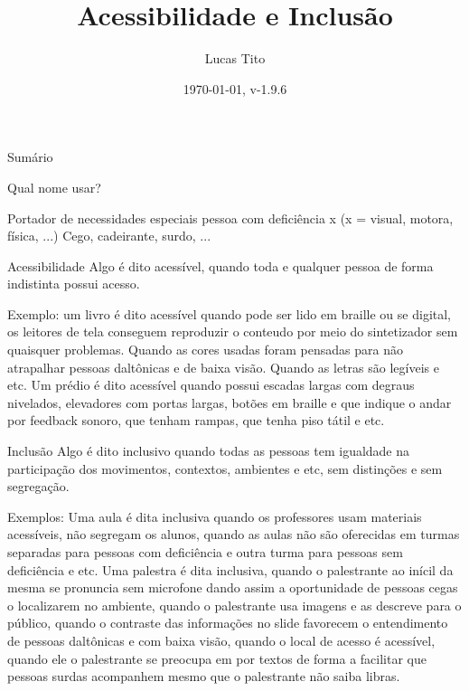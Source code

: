 \documentclass[aspectratio=169]{beamer}
\title{Acessibilidade e Inclusão}
\author{Lucas Tito}
\institute{Grupo de Apoio a Pesquisas Em Acessibilidade e Inclusão - GAPAI}
\date{\today, v-1.9.6}
\begin{document}
\begin{frame}

\titlepage

\end{frame}

\begin{frame}{Sumário}
\tableofcontents
\end{frame}


\begin{frame}{Qual nome usar?}

Portador de necessidades especiais
pessoa com deficiência x (x = visual, motora, física, ...)
Cego, cadeirante, surdo, ...

\end{frame}

\begin{frame}{Acessibilidade}
Algo é dito acessível, quando toda e qualquer pessoa de forma indistinta possui acesso.

Exemplo:
um livro é dito acessível quando pode ser lido em braille ou se digital, os leitores de tela conseguem reproduzir o conteudo por meio do sintetizador sem quaisquer problemas. Quando as cores usadas foram pensadas para não atrapalhar pessoas daltônicas e de baixa visão. Quando as letras são legíveis e etc.
Um prédio é dito acessível quando possui escadas largas com degraus nivelados, elevadores com portas largas, botões em braille e que indique o andar por feedback sonoro, que tenham rampas, que tenha piso tátil e etc.

\end{frame}

\begin{frame}{Inclusão}
Algo é dito inclusivo quando todas as pessoas tem igualdade na participação dos movimentos, contextos, ambientes e etc, sem distinções e sem segregação.

Exemplos:
Uma aula é dita inclusiva quando os professores usam materiais acessíveis, não segregam os alunos, quando as aulas não são oferecidas em turmas separadas para pessoas com deficiência e outra turma para pessoas sem deficiência e etc.
Uma palestra é dita inclusiva, quando o palestrante ao inícil da mesma se pronuncia sem microfone dando assim a oportunidade de pessoas cegas o localizarem no ambiente, quando o palestrante usa imagens e as descreve para o público, quando o contraste das informações no slide favorecem o entendimento de pessoas daltônicas e com baixa visão, quando o local de acesso é acessível, quando ele o palestrante se preocupa em por textos de forma a facilitar que pessoas surdas acompanhem mesmo que o palestrante não saiba libras.
\end{frame}
\end{document}
